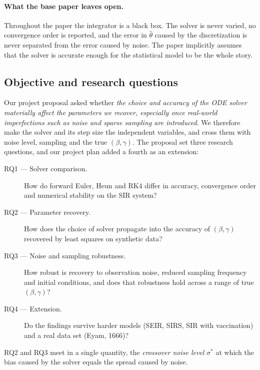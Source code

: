 \documentclass[sigconf]{acmart}
\begin{document}
\paragraph{What the base paper leaves open.} Throughout the paper the
integrator is a black box. The solver is never varied, no convergence
order is reported, and the error in $\hat\theta$ caused by the
discretization is never separated from the error caused by noise. The
paper implicitly assumes that the solver is accurate enough for the
statistical model to be the whole story.

\subsection{Objective and research questions}
Our project proposal asked whether \emph{the choice and accuracy of the
ODE solver materially affect the parameters we recover, especially once
real-world imperfections such as noise and sparse sampling are
introduced}. We therefore make the solver and its step size the
independent variables, and cross them with noise level, sampling and the
true $(\beta,\gamma)$. The proposal set three research questions, and
our project plan added a fourth as an extension:
\begin{description}
  \item[RQ1 --- Solver comparison.] How do forward Euler, Heun and RK4
    differ in accuracy, convergence order and numerical stability on the
    SIR system?
  \item[RQ2 --- Parameter recovery.] How does the choice of solver
    propagate into the accuracy of $(\beta,\gamma)$ recovered by least
    squares on synthetic data?
  \item[RQ3 --- Noise and sampling robustness.] How robust is recovery to
    observation noise, reduced sampling frequency and initial
    conditions, and does that robustness hold across a range of true
    $(\beta,\gamma)$?
  \item[RQ4 --- Extension.] Do the findings survive harder models (SEIR,
    SIRS, SIR with vaccination) and a real data set (Eyam, 1666)?
\end{description}
RQ2 and RQ3 meet in a single quantity, the \emph{crossover noise level}
$\sigma^*$ at which the bias caused by the solver equals the spread
caused by noise.
\end{document}
